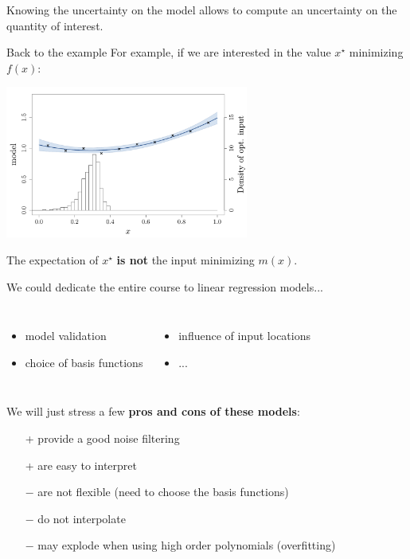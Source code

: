 \documentclass{beamer}
\begin{document}
\begin{frame}{}
Knowing the uncertainty on the model allows to compute an uncertainty on the quantity of interest.
\begin{exampleblock}{Back to the example}
For example, if we are interested in the value $x^\star$ minimizing $f(x)$:
\begin{center}
  \includegraphics[height=5cm]{figures/R/linreg_6}
\end{center}
\end{exampleblock}
\alert{The expectation of $x^\star$ \textbf{is not} the input minimizing $m(x).$}
\end{frame}

\begin{frame}{}
We could dedicate the entire course to linear regression models...
\begin{columns}[c]
\column{5cm}
\begin{itemize}
	\item model validation
	\item choice of basis functions
\end{itemize}
\column{6cm}
\begin{itemize}
	\item influence of input locations
	\item ...
\end{itemize}
\end{columns}
\vspace{10mm}
We will just stress a few \textbf{pros and cons of these models}:
\begin{itemize}
  \item[+] provide a good noise filtering
  \item[+] are easy to interpret
  \item[] \vspace{-5mm}
  \item[$-$] are not flexible (need to choose the basis functions)
  \item[$-$] do not interpolate
  \item[$-$] may explode when using high order polynomials (overfitting)
\end{itemize}
\end{frame}
\end{document}
